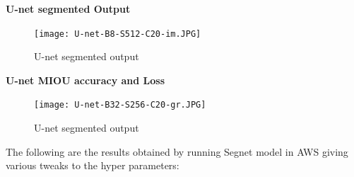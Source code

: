 \documentclass{IEEEtran}
\begin{document}
\begin{enumerate}
\textbf{U-net segmented Output}

\begin{figure}[h]
    \centering
    \captionsetup{justification=centering}
    \texttt{[image: U-net-B8-S512-C20-im.JPG]}
    \caption{U-net segmented output}
    \label{fig:Binary class segmented output}
\end{figure}


\textbf{U-net MIOU accuracy and Loss}

\begin{figure}[h]
    \centering
    \captionsetup{justification=centering}
    \texttt{[image: U-net-B32-S256-C20-gr.JPG]}
    \caption{U-net segmented output}
    \label{fig:Binary class segmented output}
\end{figure}


\end{enumerate}


The following are the results obtained by running Segnet model in AWS giving various tweaks to the hyper parameters:
\end{document}
